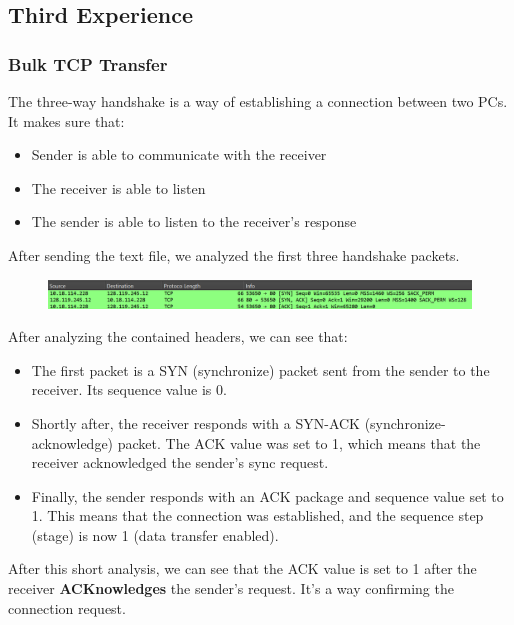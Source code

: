 \subsection{Third Experience}

\subsubsection{Bulk TCP Transfer}

The three-way handshake is a way of establishing a connection between two PCs.
It makes sure that:

\begin{itemize}
    \item Sender is able to communicate with the receiver
    \item The receiver is able to listen
    \item The sender is able to listen to the receiver's response
\end{itemize}

After sending the text file, we analyzed the first three handshake packets.

\begin{figure}[htbp]
    \centering
    \includegraphics[width=1\linewidth]{img/third_experience/1.png}
    \caption{}\label{fig:3_1}
\end{figure}

After analyzing the contained headers, we can see that:

\begin{itemize}
    \item The first packet is a SYN (synchronize) packet sent from the sender to the
          receiver. Its sequence value is 0.
    \item Shortly after, the receiver responds with a SYN-ACK (synchronize-acknowledge)
          packet. The ACK value was set to 1, which means that the receiver acknowledged
          the sender's sync request.
    \item Finally, the sender responds with an ACK package and sequence value set to 1.
          This means that the connection was established, and the sequence step (stage)
          is now 1 (data transfer enabled).
\end{itemize}

After this short analysis, we can see that the ACK value is set to 1 after the
receiver \textbf{ACKnowledges} the sender's request. It's a way confirming the
connection request.

